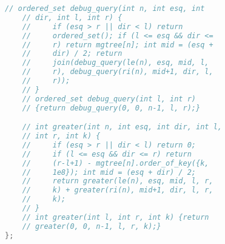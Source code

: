 \documentclass[11pt, a4paper, oneside]{book}
\begin{document}
\begin{multicols}{2}
\begin{lstlisting}[language=C++]
    // ordered_set debug_query(int n, int esq, int
    // dir, int l, int r) {
    //     if (esq > r || dir < l) return
    //     ordered_set(); if (l <= esq && dir <=
    //     r) return mgtree[n]; int mid = (esq +
    //     dir) / 2; return
    //     join(debug_query(le(n), esq, mid, l,
    //     r), debug_query(ri(n), mid+1, dir, l,
    //     r));
    // }
    // ordered_set debug_query(int l, int r)
    // {return debug_query(0, 0, n-1, l, r);}

    // int greater(int n, int esq, int dir, int l,
    // int r, int k) {
    //     if (esq > r || dir < l) return 0;
    //     if (l <= esq && dir <= r) return
    //     (r-l+1) - mgtree[n].order_of_key({k,
    //     1e8}); int mid = (esq + dir) / 2;
    //     return greater(le(n), esq, mid, l, r,
    //     k) + greater(ri(n), mid+1, dir, l, r,
    //     k);
    // }
    // int greater(int l, int r, int k) {return
    // greater(0, 0, n-1, l, r, k);}
};
\end{lstlisting}
\end{multicols}

\hfill
\end{document}
